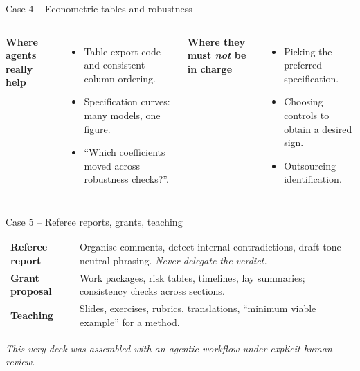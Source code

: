 \begin{frame}{Case 4 -- Econometric tables and robustness}
  \begin{columns}[T,onlytextwidth]
      \textbf{Where agents really help}
      \begin{itemize}\setlength\itemsep{0.3em}
        \item Table-export code and consistent column ordering.
        \item Specification curves: many models, one figure.
        \item ``Which coefficients moved across robustness checks?''.
      \end{itemize}
      \textbf{Where they must \emph{not} be in charge}
      \begin{itemize}\setlength\itemsep{0.3em}
        \item Picking the preferred specification.
        \item Choosing controls to obtain a desired sign.
        \item Outsourcing identification.
      \end{itemize}
  \end{columns}
  \vspace{0.4cm}
\end{frame}

\begin{frame}{Case 5 -- Referee reports, grants, teaching}
  \vspace{0.2cm}
  \begin{center}
  \begin{tabularx}{0.92\linewidth}{>{\bfseries\color{deepblue}}lX}
  \toprule
  Referee report & Organise comments, detect internal contradictions, draft tone-neutral phrasing. \emph{Never delegate the verdict.}\\
  Grant proposal & Work packages, risk tables, timelines, lay summaries; consistency checks across sections.\\
  Teaching & Slides, exercises, rubrics, translations, ``minimum viable example'' for a method.\\
  \bottomrule
  \end{tabularx}
  \end{center}
  \vspace{0.4cm}
  \begin{center}\small\color{muted}\itshape This very deck was assembled with an agentic workflow under explicit human review.\end{center}
\end{frame}

